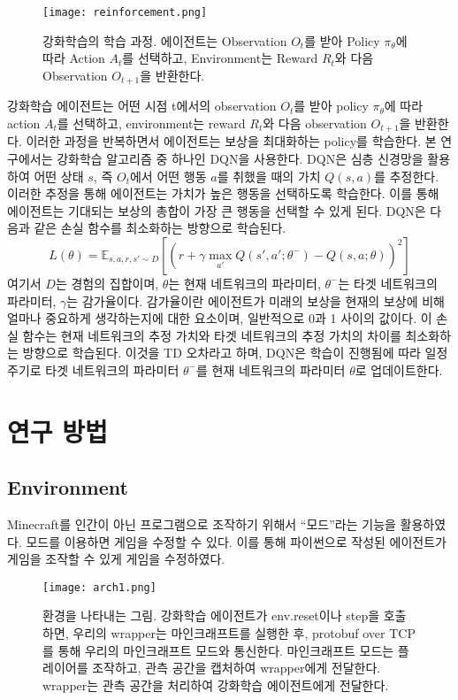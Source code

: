 \documentclass{tudelftposter}
\begin{document}
\begin{figure}
  \centering
  \texttt{[image: reinforcement.png]}
  \caption{강화학습의 학습 과정. 에이전트는 Observation $O_t$를 받아 Policy $\pi_\theta$에 따라 Action $A_t$를 선택하고, Environment는 Reward $R_t$와 다음 Observation $O_{t+1}$을 반환한다.}
  \label{fig:reinforcement}
\end{figure}
강화학습 에이전트는 어떤 시점 t에서의 observation $O_t$를 받아 policy $\pi_\theta$에 따라 action $A_t$를 선택하고, environment는 reward $R_t$와 다음 observation $O_{t+1}$을 반환한다. 이러한 과정을 반복하면서 에이전트는 보상을 최대화하는 policy를 학습한다. 본 연구에서는 강화학습 알고리즘 중 하나인 DQN을 사용한다. DQN은 심층 신경망을 활용하여 어떤 상태 $s$, 즉 $O_t$에서 어떤 행동 $a$를 취했을 때의 가치 $Q(s,a)$를 추정한다. 이러한 추정을 통해 에이전트는 가치가 높은 행동을 선택하도록 학습한다. 이를 통해 에이전트는 기대되는 보상의 총합이 가장 큰 행동을 선택할 수 있게 된다. DQN은 다음과 같은 손실 함수를 최소화하는 방향으로 학습된다.
\begin{equation}
  L(\theta) = \mathbb{E}_{s,a,r,s' \sim D}[(r + \gamma \max_{a'}Q(s',a';\theta^-) - Q(s,a;\theta))^2]
\end{equation}
여기서 $D$는 경험의 집합이며, $\theta$는 현재 네트워크의 파라미터, $\theta^-$는 타겟 네트워크의 파라미터, $\gamma$는 감가율이다. 감가율이란 에이전트가 미래의 보상을 현재의 보상에 비해 얼마나 중요하게 생각하는지에 대한 요소이며, 일반적으로 0과 1 사이의 값이다. 이 손실 함수는 현재 네트워크의 추정 가치와 타겟 네트워크의 추정 가치의 차이를 최소화하는 방향으로 학습된다. 이것을 TD 오차라고 하며, DQN은 학습이 진행됨에 따라 일정 주기로 타겟 네트워크의 파라미터 $\theta^-$를 현재 네트워크의 파라미터 $\theta$로 업데이트한다.

\section{연구 방법}
\subsection{Environment}
Minecraft를 인간이 아닌 프로그램으로 조작하기 위해서 ``모드''라는 기능을 활용하였다. 모드를 이용하면 게임을 수정할 수 있다. 이를 통해 파이썬으로 작성된 에이전트가 게임을 조작할 수 있게 게임을 수정하였다.

\begin{figure}
  \centering
  \texttt{[image: arch1.png]}
  \caption{환경을 나타내는 그림. 강화학습 에이전트가 env.reset이나 step을 호출하면, 우리의 wrapper는 마인크래프트를 실행한 후, protobuf over TCP를 통해 우리의 마인크래프트 모드와 통신한다. 마인크래프트 모드는 플레이어를 조작하고, 관측 공간을 캡처하여 wrapper에게 전달한다. wrapper는 관측 공간을 처리하여 강화학습 에이전트에게 전달한다.}
  \label{fig:test}
\end{figure}
\end{document}
